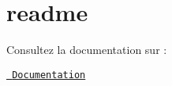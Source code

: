 \chapter{readme}
\hypertarget{md__2home_2julian_2_documentos_2_e_n_s_i_2_c_09_09_2_t_p8_2cppma-spring2023-lab5-infra-test_2_project___infra___test_2readme}{}\label{md__2home_2julian_2_documentos_2_e_n_s_i_2_c_09_09_2_t_p8_2cppma-spring2023-lab5-infra-test_2_project___infra___test_2readme}
Consultez la documentation sur \+:

\href{./doc/html/index.html}{\texttt{ Documentation}} 
